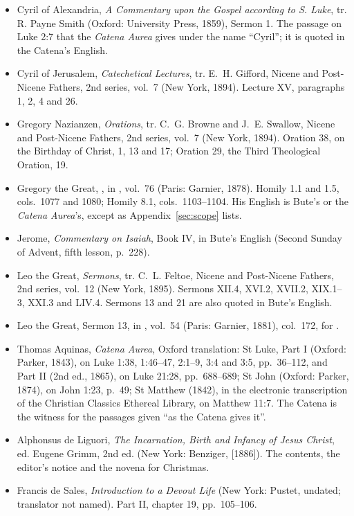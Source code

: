 \begin{itemize}[leftmargin=1.3em, itemsep=0.3em]
\item Cyril of Alexandria, \textit{A Commentary upon the Gospel according to S. Luke}, tr.
R. Payne Smith (Oxford: University Press, 1859), Sermon 1. The passage on Luke 2:7 that the
\textit{Catena Aurea} gives under the name ``Cyril''; it is quoted in the Catena's English.
\item Cyril of Jerusalem, \textit{Catechetical Lectures}, tr. E.~H. Gifford, Nicene and Post-Nicene
Fathers, 2nd series, vol.~7 (New York, 1894). Lecture XV, paragraphs 1, 2, 4 and 26.
\item Gregory Nazianzen, \textit{Orations}, tr. C.~G. Browne and J.~E. Swallow, Nicene and
Post-Nicene Fathers, 2nd series, vol.~7 (New York, 1894). Oration 38, on the Birthday of Christ,
1, 13 and 17; Oration 29, the Third Theological Oration, 19.
\item Gregory the Great, , in , vol.~76
(Paris: Garnier, 1878). Homily 1.1 and 1.5, cols.~1077 and 1080; Homily 8.1, cols.~1103--1104. His
English is Bute's or the \textit{Catena Aurea}'s, except as Appendix~\ref{sec:scope} lists.
\item Jerome, \textit{Commentary on Isaiah}, Book IV, in Bute's English (Second Sunday of Advent,
fifth lesson, p.~228).
\item Leo the Great, \textit{Sermons}, tr. C.~L. Feltoe, Nicene and Post-Nicene Fathers, 2nd
series, vol.~12 (New York, 1895). Sermons XII.4, XVI.2, XVII.2, XIX.1--3, XXI.3 and LIV.4. Sermons
13 and 21 are also quoted in Bute's English.
\item Leo the Great, Sermon 13, in , vol.~54 (Paris: Garnier, 1881),
col.~172, for .
\item Thomas Aquinas, \textit{Catena Aurea}, Oxford translation: St Luke, Part I (Oxford: Parker,
1843), on Luke 1:38, 1:46--47, 2:1--9, 3:4 and 3:5, pp.~36--112, and Part II (2nd ed., 1865), on
Luke 21:28, pp.~688--689; St John (Oxford: Parker, 1874), on John 1:23, p.~49; St Matthew (1842),
in the electronic transcription of the Christian Classics Ethereal Library, on Matthew 11:7. The
Catena is the witness for the passages given ``as the Catena gives it''.
\item Alphonsus de Liguori, \textit{The Incarnation, Birth and Infancy of Jesus Christ}, ed. Eugene
Grimm, 2nd ed. (New York: Benziger, [1886]). The contents, the editor's notice and the novena for
Christmas.
\item Francis de Sales, \textit{Introduction to a Devout Life} (New York: Pustet, undated;
translator not named). Part II, chapter 19, pp.~105--106.
\end{itemize}

